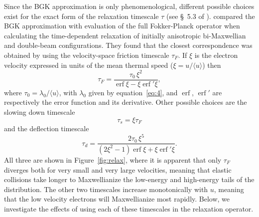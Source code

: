 \documentclass{emulateapj}
\newcommand\ubar{\ensuremath{\langle u \rangle}}
\begin{document}
Since the BGK approximation is only phenomenological, different
possible choices exist for the exact form of the relaxation timescale
\(\tau\)
(see \S~5.3 of \citealp{Spitzer:1956a}).  \citet{Livi:1986a} compared the
BGK approximation with evaluation of the full Fokker-Planck operator
when calculating the time-dependent relaxation of initially
anisotropic bi-Maxwellian and double-beam configurations.  They found
that the closest correspondence was obtained by using the
velocity-space friction timescale \(\tau_{F}\).  If \(\xi\)
is the electron velocity expressed in units of the mean thermal speed
(\(\xi = u /\ubar\)) then \newcommand\erf{\operatorname{erf}}
\begin{equation}
  \label{eq:3}
  \tau_{F} = \frac{\tau_0 \, \xi^2}{\erf\xi - \xi\erf'\!\xi}, 
\end{equation}
where \(\tau_0 = \lambda_0 / \ubar\), with \(\lambda_0\) given by
equation~\eqref{eq:4}, and \(\erf\), \(\erf'\) are respectively the
error function and its derivative. Other possible
choices are the slowing down timescale
\begin{equation}
  \label{eq:9}
  \tau_{s} = \xi \tau_{F} 
\end{equation}
and the deflection timescale 
\begin{equation}
  \label{eq:10}
  \tau_{d} = \frac{2 \tau_0 \, \xi^5}{(2\xi^2 - 1)\erf\xi + \xi\erf'\!\xi} .  
\end{equation}
All three are shown in Figure~\ref{fig:relax}, where it is apparent
that only \(\tau_F\)
diverges both for very small and very large velocities, meaning that
elastic collisions take longer to Maxwellianize the low-energy and
high-energy tails of the distribution.  The other two timescales
increase monotonically with \(u\),
meaning that the low velocity electrons will Maxwellianize most
rapidly.  Below, we investigate the effects of using each of these
timescales in the relaxation operator.
\end{document}
